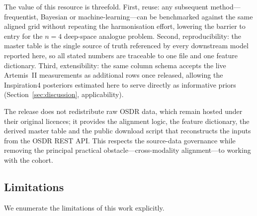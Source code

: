 \documentclass[11pt,a4paper,3p,authoryear]{elsarticle}
\begin{document}
The value of this resource is threefold. First, reuse: any subsequent method---frequentist, Bayesian or machine-learning---can be benchmarked against the same aligned grid without repeating the harmonisation effort, lowering the barrier to entry for the $n=4$ deep-space analogue problem. Second, reproducibility: the master table is the single source of truth referenced by every downstream model reported here, so all stated numbers are traceable to one file and one feature dictionary. Third, extensibility: the same column schema accepts the live Artemis~II measurements as additional rows once released, allowing the Inspiration4 posteriors estimated here to serve directly as informative priors (Section~\ref{sec:discussion}, applicability).

The release does not redistribute raw OSDR data, which remain hosted under their original licences; it provides the alignment logic, the feature dictionary, the derived master table and the public download script that reconstructs the inputs from the OSDR REST API. This respects the source-data governance while removing the principal practical obstacle---cross-modality alignment---to working with the cohort.

\subsection{Limitations}\label{sec:discussion-limitations}

We enumerate the limitations of this work explicitly.
\end{document}
